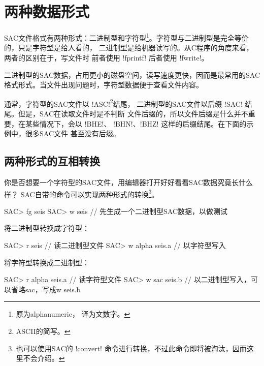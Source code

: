 \section{两种数据形式}
SAC文件格式有两种形式：二进制型和字符型\footnote{原为alphanumeric，
译为文数字。}。字符型与二进制型是完全等价的，只是字符型是给人看的，
二进制型是给机器读写的。从C程序的角度来看，两者的区别在于，写文件时
前者使用 !fprintf! 后者使用 !fwrite!。

二进制型的SAC数据，占用更小的磁盘空间，读写速度更快，因而是最常用的SAC
格式形式。当文件出现问题时，字符型数据便于查看文件内容。

通常，字符型的SAC文件以 !ASC!\footnote{ASCII的简写。}结尾，
二进制型的SAC文件以后缀 !SAC! 结尾。但是，SAC在读取文件时是不判断
文件后缀的，所以文件后缀是什么并不重要，在某些情况下，会以 !BHE!、
!BHN!、!BHZ! 这样的后缀结尾。在下面的示例中，很多SAC文件
甚至没有后缀。

\subsection{两种形式的互相转换}
你是否想要一个字符型的SAC文件，用编辑器打开好好看看SAC数据究竟长什么样？
SAC自带的命令可以实现两种形式的转换\footnote{也可以使用SAC的
!convert! 命令进行转换，不过此命令即将被淘汰，因而这里不会介绍。}。
\begin{SACCode}
SAC> fg seis
SAC> w seis             // 先生成一个二进制型SAC数据，以做测试
\end{SACCode}

将二进制型转换成字符型：
\begin{SACCode}
SAC> r seis             // 读二进制型文件
SAC> w alpha seis.a     // 以字符型写入
\end{SACCode}

将字符型转换成二进制型：
\begin{SACCode}
SAC> r alpha seis.a     // 读字符型文件
SAC> w sac seis.b       // 以二进制型写入，可以省略sac，写成w seis.b
\end{SACCode}


